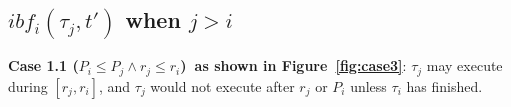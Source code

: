 \documentclass[12pt,conference,twocolumn]{IEEEtran}
\begin{document}





% 
\subsection{$ibf_i(\tau_j,t')$ when $j> i$}
 


\textbf{Case 1.1 ($P_i\leq P_j\wedge r_j\leq r_i$)~as shown in  Figure~\ref{fig:case3}}: $\tau_j$ may execute during $[r_j,r_i]$, and $\tau_j$ would not execute after $r_j$ or $P_i$ unless $\tau_i$ has finished.
\end{document}
